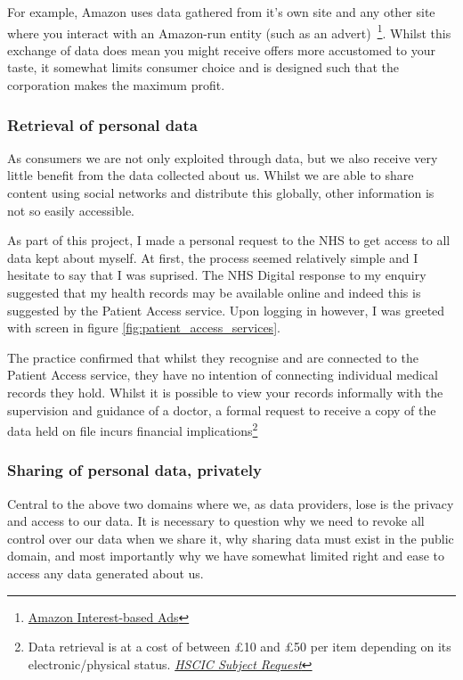 For example, Amazon uses data gathered from it's own site and any other site where you interact with an Amazon-run entity (such as an advert)~\footnote{\href{https://www.amazon.com/b?node=5160028011}{Amazon Interest-based Ads}}. Whilst this exchange of data does mean you might receive offers more accustomed to your taste, it somewhat limits consumer choice and is designed such that the corporation makes the maximum profit.

\subsubsection{Retrieval of personal data}

As consumers we are not only exploited through data, but we also receive very little benefit from the data collected about us. Whilst we are able to share content using social networks and distribute this globally, other information is not so easily accessible.

As part of this project, I made a personal request to the NHS to get access to all data kept about myself. At first, the process seemed relatively simple and I hesitate to say that I was suprised. The NHS Digital response to my enquiry suggested that my health records may be available online and indeed this is suggested by the Patient Access service. Upon logging in however, I was greeted with screen in figure \ref{fig:patient_access_services}.



The practice confirmed that whilst they recognise and are connected to the Patient Access service, they have no intention of connecting individual medical records they hold. Whilst it is possible to view your records informally with the supervision and guidance of a doctor, a formal request to receive a copy of the data held on file incurs financial implications\footnote{Data retrieval is at a cost of between £10 and £50 per item depending on its electronic/physical status. \href{https://www.gov.uk/government/publications/subject-access-request}{\textit{HSCIC Subject Request}}}

\subsubsection{Sharing of personal data, privately}

Central to the above two domains where we, as data providers, lose is the privacy and access to our data. It is necessary to question why we need to revoke all control over our data when we share it, why sharing data must exist in the public domain, and most importantly why we have somewhat limited right and ease to access any data generated about us.


